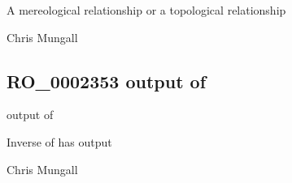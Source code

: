 \documentclass[letterpaper,10pt,english]{sphinxmanual}
\begin{document}
\begin{sphinxShadowBox}

\sphinxAtStartPar
A mereological relationship or a topological relationship
\end{sphinxShadowBox}

\begin{sphinxShadowBox}

\sphinxAtStartPar
{}
\end{sphinxShadowBox}

\begin{sphinxShadowBox}

\sphinxAtStartPar
Chris Mungall
\end{sphinxShadowBox}
\begin{quote}

\ignorespaces \end{quote}


\subsection{RO\_0002353 \sphinxhyphen{} output of}
\label{\detokenize{doc-RO_0002353:ro-0002353-output-of}}\label{\detokenize{doc-RO_0002353:index-0}}\label{\detokenize{doc-RO_0002353::doc}}
\begin{sphinxShadowBox}

\sphinxAtStartPar
output of
\end{sphinxShadowBox}

\begin{sphinxShadowBox}

\sphinxAtStartPar
Inverse of has output
\end{sphinxShadowBox}

\begin{sphinxShadowBox}

\sphinxAtStartPar
{}
\end{sphinxShadowBox}

\begin{sphinxShadowBox}

\sphinxAtStartPar
Chris Mungall
\end{sphinxShadowBox}
\begin{quote}

\ignorespaces \end{quote}
\end{document}
